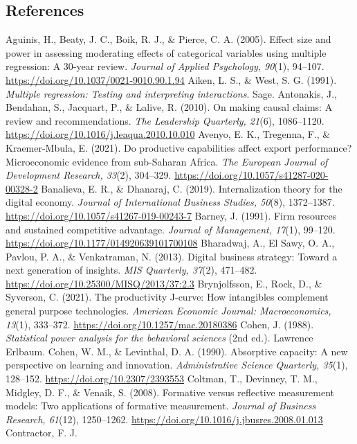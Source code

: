 \documentclass[
  12pt,a4paper]{article}
\begin{document}
\hypertarget{references}{%
\subsection{References}\label{references}}

Aguinis, H., Beaty, J. C., Boik, R. J., \& Pierce, C. A. (2005). Effect
size and power in assessing moderating effects of categorical variables
using multiple regression: A 30-year review. \emph{Journal of Applied
Psychology, 90}(1), 94--107.
\url{https://doi.org/10.1037/0021-9010.90.1.94} Aiken, L. S., \& West,
S. G. (1991). \emph{Multiple regression: Testing and interpreting
interactions}. Sage. Antonakis, J., Bendahan, S., Jacquart, P., \&
Lalive, R. (2010). On making causal claims: A review and
recommendations. \emph{The Leadership Quarterly, 21}(6), 1086--1120.
\url{https://doi.org/10.1016/j.leaqua.2010.10.010} Avenyo, E. K.,
Tregenna, F., \& Kraemer-Mbula, E. (2021). Do productive capabilities
affect export performance? Microeconomic evidence from sub-Saharan
Africa. \emph{The European Journal of Development Research, 33}(2),
304--329. \url{https://doi.org/10.1057/s41287-020-00328-2} Banalieva, E.
R., \& Dhanaraj, C. (2019). Internalization theory for the digital
economy. \emph{Journal of International Business Studies, 50}(8),
1372--1387. \url{https://doi.org/10.1057/s41267-019-00243-7} Barney, J.
(1991). Firm resources and sustained competitive advantage.
\emph{Journal of Management, 17}(1), 99--120.
\url{https://doi.org/10.1177/014920639101700108} Bharadwaj, A., El Sawy,
O. A., Pavlou, P. A., \& Venkatraman, N. (2013). Digital business
strategy: Toward a next generation of insights. \emph{MIS Quarterly,
37}(2), 471--482. \url{https://doi.org/10.25300/MISQ/2013/37:2.3}
Brynjolfsson, E., Rock, D., \& Syverson, C. (2021). The productivity
J-curve: How intangibles complement general purpose technologies.
\emph{American Economic Journal: Macroeconomics, 13}(1), 333--372.
\url{https://doi.org/10.1257/mac.20180386} Cohen, J. (1988).
\emph{Statistical power analysis for the behavioral sciences} (2nd ed.).
Lawrence Erlbaum. Cohen, W. M., \& Levinthal, D. A. (1990). Absorptive
capacity: A new perspective on learning and innovation.
\emph{Administrative Science Quarterly, 35}(1), 128--152.
\url{https://doi.org/10.2307/2393553} Coltman, T., Devinney, T. M.,
Midgley, D. F., \& Venaik, S. (2008). Formative versus reflective
measurement models: Two applications of formative measurement.
\emph{Journal of Business Research, 61}(12), 1250--1262.
\url{https://doi.org/10.1016/j.jbusres.2008.01.013} Contractor, F. J.
\end{document}
